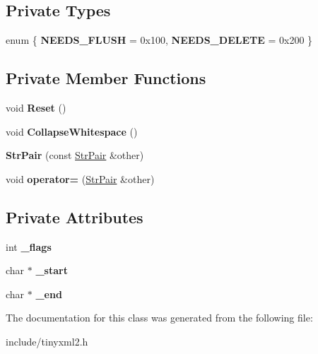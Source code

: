\subsection*{Private Types}
\begin{DoxyCompactItemize}
\item 
\hypertarget{classtinyxml2_1_1_str_pair_a476a92d76f24486c3ae4731916b12aae}{}enum \{ {\bfseries N\+E\+E\+D\+S\+\_\+\+F\+L\+U\+S\+H} = 0x100, 
{\bfseries N\+E\+E\+D\+S\+\_\+\+D\+E\+L\+E\+T\+E} = 0x200
 \}\label{classtinyxml2_1_1_str_pair_a476a92d76f24486c3ae4731916b12aae}

\end{DoxyCompactItemize}
\subsection*{Private Member Functions}
\begin{DoxyCompactItemize}
\item 
\hypertarget{classtinyxml2_1_1_str_pair_a80c1b3bd99bf62ae85c94a29ce537125}{}void {\bfseries Reset} ()\label{classtinyxml2_1_1_str_pair_a80c1b3bd99bf62ae85c94a29ce537125}

\item 
\hypertarget{classtinyxml2_1_1_str_pair_ade1469025e6b4cac74397a82a7429337}{}void {\bfseries Collapse\+Whitespace} ()\label{classtinyxml2_1_1_str_pair_ade1469025e6b4cac74397a82a7429337}

\item 
\hypertarget{classtinyxml2_1_1_str_pair_ac43c1f4a5730c5582f9cff724376d106}{}{\bfseries Str\+Pair} (const \hyperlink{classtinyxml2_1_1_str_pair}{Str\+Pair} \&other)\label{classtinyxml2_1_1_str_pair_ac43c1f4a5730c5582f9cff724376d106}

\item 
\hypertarget{classtinyxml2_1_1_str_pair_a0f095caeacc0b1fd9fee55cd71261ab4}{}void {\bfseries operator=} (\hyperlink{classtinyxml2_1_1_str_pair}{Str\+Pair} \&other)\label{classtinyxml2_1_1_str_pair_a0f095caeacc0b1fd9fee55cd71261ab4}

\end{DoxyCompactItemize}
\subsection*{Private Attributes}
\begin{DoxyCompactItemize}
\item 
\hypertarget{classtinyxml2_1_1_str_pair_ae6fabc08e7b24b0d41fa5f2fadbda4ed}{}int {\bfseries \+\_\+flags}\label{classtinyxml2_1_1_str_pair_ae6fabc08e7b24b0d41fa5f2fadbda4ed}

\item 
\hypertarget{classtinyxml2_1_1_str_pair_acfd8687916a02833cc55c279460d2f4a}{}char $\ast$ {\bfseries \+\_\+start}\label{classtinyxml2_1_1_str_pair_acfd8687916a02833cc55c279460d2f4a}

\item 
\hypertarget{classtinyxml2_1_1_str_pair_a855c81f785458d8f84313221f2d4a1eb}{}char $\ast$ {\bfseries \+\_\+end}\label{classtinyxml2_1_1_str_pair_a855c81f785458d8f84313221f2d4a1eb}

\end{DoxyCompactItemize}


The documentation for this class was generated from the following file\+:\begin{DoxyCompactItemize}
\item 
include/tinyxml2.\+h\end{DoxyCompactItemize}

